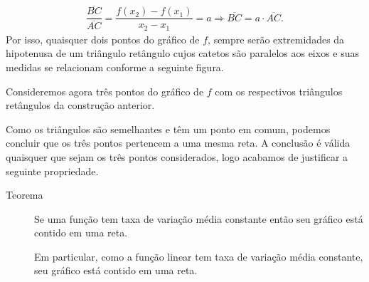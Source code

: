 \begin{equation*}
\begin{split}\dfrac{\overline{BC}}{\overline{AC}}= \dfrac{f(x_2)-f(x_1)}{x_2-x_1}=a \Longrightarrow \overline{BC}=a\cdot \overline{AC}.\end{split}
\end{equation*}
Por isso, quaisquer dois pontos do gráfico de \(f\), sempre serão extremidades da hipotenusa de um triângulo retângulo cujos catetos são paralelos aos eixos e suas medidas se relacionam conforme a seguinte figura.

\begin{figure}[H]
\centering

\end{figure}

Consideremos agora três pontos do gráfico de \(f\) com os respectivos triângulos retângulos da construção anterior.
\begin{figure}[H]
\centering

\end{figure}
Como os triângulos são semelhantes e têm um ponto em comum, podemos concluir que os três pontos pertencem a uma mesma reta. A conclusão é válida quaisquer que sejam os três pontos considerados, logo acabamos de justificar a seguinte propriedade.

\begin{description}
\item[Teorema]

Se uma função tem taxa de variação média constante então seu gráfico está contido em uma reta.

Em particular, como a função linear tem taxa de variação média constante, seu gráfico está contido em uma reta.
\end{description}


